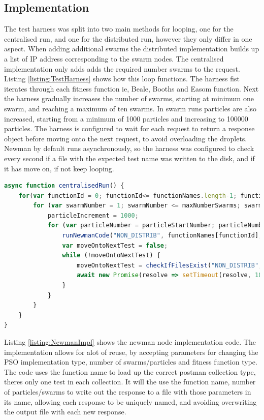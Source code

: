 \documentclass[oneside,12pt]{book}
\begin{document}
\subsection{Implementation}
The test harness was split into two main methods for looping, one for the centralised run, and one for the distributed run, however they only differ in one aspect. When adding additional swarms the distributed implementation builds up a list of IP address corresponding to the swarm nodes. The centralised implementation only adds adds the required number swarms to the request. Listing \ref{listing:TestHarness} shows how this loop functions. The harness fist iterates through each fitness function ie, Beale, Booths and Easom function. Next the harness gradually increases the number of swarms, starting at minimum one swarm, and reaching a maximum of ten swarms. In swarm runs particles are also increased, starting from a minimum of 1000 particles and increasing to 100000 particles. The harness is configured to wait for each request to return a response object before moving onto the next request, to avoid overloading the droplets. Newman by default runs asynchronously, so the harness was configured to check every second if a file with the expected test name was written to the disk, and if it has move on, if not keep looping. 

\begin{lstlisting}[basicstyle=\footnotesize, language=JavaScript]
async function centralisedRun() {
    for(var functionId = 0; functionId<= functionNames.length-1; functionId ++) {
        for (var swarmNumber = 1; swarmNumber <= maxNumberSwarms; swarmNumber++) {
            particleIncrement = 1000;
            for (var particleNumber = particleStartNumber; particleNumber <= maxNumberParticles; particleNumber += particleIncrement) {
                runNewmanCode("NON_DISTRIB", functionNames[functionId], "Remote", swarmNumber, particleNumber, baseUrlStringsNonDistributed, nonDistribEndpoint);
                var moveOntoNextTest = false;
                while (!moveOntoNextTest) {
                    moveOntoNextTest = checkIfFilesExist("NON_DISTRIB", functionNames[functionId], swarmNumber, particleNumber);
                    await new Promise(resolve => setTimeout(resolve, 1000));
                }
            }
        }
    }
}
\end{lstlisting}
\label{listing:TestHarness}

Listing \ref{listing:NewmanImpl} shows the newman node implementation code. The implementation allows for alot of reuse, by accepting parameters for changing the PSO implementation type, number of swarms/particles and fitness function type. The code uses the function name to load up the correct postman collection type, theres only one test in each collection. It will the use the function name, number of particles/swarms to write out the response to a file with those parameters in its name, allowing each response to be uniquely named, and avoiding overwriting the output file with each new response. 
\end{document}
